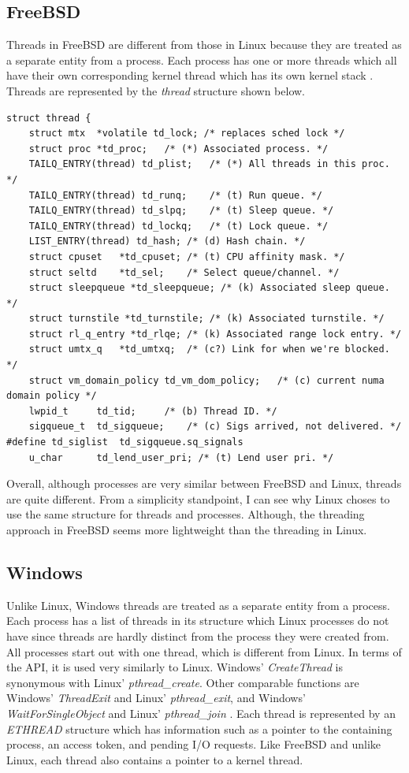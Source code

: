 \documentclass[10pt,draftclsnofoot,onecolumn,journal,compsoc]{IEEEtran}
\begin{document}
\subsection{FreeBSD}
Threads in FreeBSD are different from those in Linux because they are treated as a separate entity from a process. Each process has one or more threads which all have their own corresponding kernel thread which has its own kernel stack \cite{bsd_thrd}. Threads are represented by the \textit{thread} structure shown below.

\begin{lstlisting}[caption={Excerpt from \textit{thread} structure}]
struct thread {
	struct mtx	*volatile td_lock; /* replaces sched lock */
	struct proc	*td_proc;	/* (*) Associated process. */
	TAILQ_ENTRY(thread) td_plist;	/* (*) All threads in this proc. */
	TAILQ_ENTRY(thread) td_runq;	/* (t) Run queue. */
	TAILQ_ENTRY(thread) td_slpq;	/* (t) Sleep queue. */
	TAILQ_ENTRY(thread) td_lockq;	/* (t) Lock queue. */
	LIST_ENTRY(thread) td_hash;	/* (d) Hash chain. */
	struct cpuset	*td_cpuset;	/* (t) CPU affinity mask. */
	struct seltd	*td_sel;	/* Select queue/channel. */
	struct sleepqueue *td_sleepqueue; /* (k) Associated sleep queue. */
	struct turnstile *td_turnstile;	/* (k) Associated turnstile. */
	struct rl_q_entry *td_rlqe;	/* (k) Associated range lock entry. */
	struct umtx_q   *td_umtxq;	/* (c?) Link for when we're blocked. */
	struct vm_domain_policy td_vm_dom_policy;	/* (c) current numa domain policy */
	lwpid_t		td_tid;		/* (b) Thread ID. */
	sigqueue_t	td_sigqueue;	/* (c) Sigs arrived, not delivered. */
#define	td_siglist	td_sigqueue.sq_signals
	u_char		td_lend_user_pri; /* (t) Lend user pri. */

\end{lstlisting}

Overall, although processes are very similar between FreeBSD and Linux, threads are quite different. From a simplicity standpoint, I can see why Linux choses to use the same structure for threads and processes. Although, the threading approach in FreeBSD seems more lightweight than the threading in Linux. 

\subsection{Windows}
Unlike Linux, Windows threads are treated as a separate entity from a process. Each process has a list of threads in its structure which Linux processes do not have since threads are hardly distinct from the process they were created from. All processes start out with one thread, which is different from Linux. In terms of the API, it is used very similarly to Linux. Windows' \textit{CreateThread} is synonymous with Linux' \textit{pthread\_create}. Other comparable functions are Windows' \textit{ThreadExit} and Linux' \textit{pthread\_exit}, and Windows' \textit{WaitForSingleObject} and Linux' \textit{pthread\_join} \cite{win_thrd}. Each thread is represented by an \textit{ETHREAD} structure which has information such as a pointer to the containing process, an access token, and pending I/O requests. Like FreeBSD and unlike Linux, each thread also contains a pointer to a kernel thread.
\end{document}
